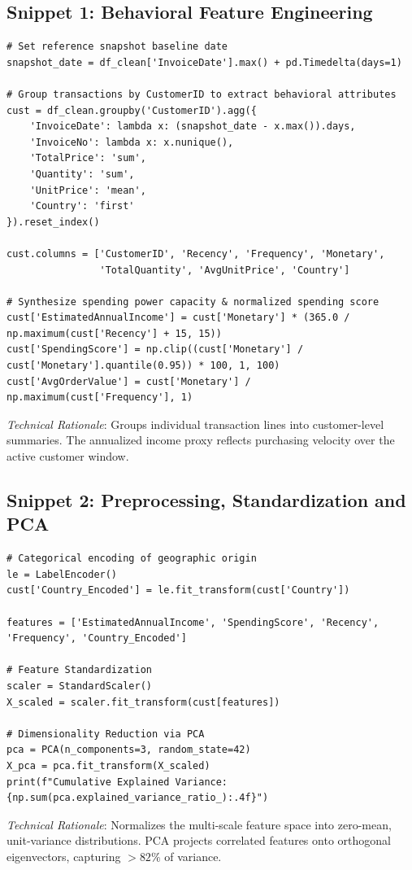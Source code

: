 \documentclass[11pt,a4paper]{article}
\begin{document}
\subsection{Snippet 1: Behavioral Feature Engineering}
\begin{lstlisting}[caption={Vectorized Customer Feature Engineering via Pandas.}]
# Set reference snapshot baseline date
snapshot_date = df_clean['InvoiceDate'].max() + pd.Timedelta(days=1)

# Group transactions by CustomerID to extract behavioral attributes
cust = df_clean.groupby('CustomerID').agg({
    'InvoiceDate': lambda x: (snapshot_date - x.max()).days,
    'InvoiceNo': lambda x: x.nunique(),
    'TotalPrice': 'sum',
    'Quantity': 'sum',
    'UnitPrice': 'mean',
    'Country': 'first'
}).reset_index()

cust.columns = ['CustomerID', 'Recency', 'Frequency', 'Monetary', 
                'TotalQuantity', 'AvgUnitPrice', 'Country']

# Synthesize spending power capacity & normalized spending score
cust['EstimatedAnnualIncome'] = cust['Monetary'] * (365.0 / np.maximum(cust['Recency'] + 15, 15))
cust['SpendingScore'] = np.clip((cust['Monetary'] / cust['Monetary'].quantile(0.95)) * 100, 1, 100)
cust['AvgOrderValue'] = cust['Monetary'] / np.maximum(cust['Frequency'], 1)
\end{lstlisting}
\textit{Technical Rationale}: Groups individual transaction lines into customer-level summaries. The annualized income proxy reflects purchasing velocity over the active customer window.

\subsection{Snippet 2: Preprocessing, Standardization and PCA}
\begin{lstlisting}[caption={Label Encoding, Feature Standardization, and Principal Component Extraction.}]
# Categorical encoding of geographic origin
le = LabelEncoder()
cust['Country_Encoded'] = le.fit_transform(cust['Country'])

features = ['EstimatedAnnualIncome', 'SpendingScore', 'Recency', 'Frequency', 'Country_Encoded']

# Feature Standardization
scaler = StandardScaler()
X_scaled = scaler.fit_transform(cust[features])

# Dimensionality Reduction via PCA
pca = PCA(n_components=3, random_state=42)
X_pca = pca.fit_transform(X_scaled)
print(f"Cumulative Explained Variance: {np.sum(pca.explained_variance_ratio_):.4f}")
\end{lstlisting}
\textit{Technical Rationale}: Normalizes the multi-scale feature space into zero-mean, unit-variance distributions. PCA projects correlated features onto orthogonal eigenvectors, capturing $>82\%$ of variance.
\end{document}
